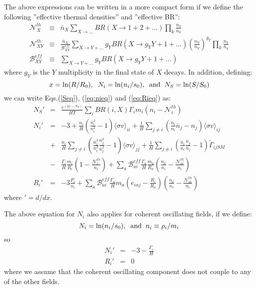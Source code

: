 \documentclass[preprint,notoc]{JHEP3}
\def\to{\rightarrow}
\def\to{\rightarrow}
\begin{document}
 
The above expressions can be written in a more compact form if we define
the following ''effective thermal densities'' and ''effective BR'':
\begin{eqnarray}
\mathcal{N}^{th}_{X} & \equiv &  \bar{n}_X \sum_{X \to \ldots} BR(X \to 1 + 2 +
\ldots)
\prod_{k}
\frac{n_k}{\bar{n}_k} \nonumber \\
\mathcal{N}^{th}_{XY} & \equiv & \frac{\bar{n}_X}{\mathcal{B}^{eff}_{XY}}
\sum_{X \to Y + \ldots} g_Y BR(X \to g_Y Y + 1 + \ldots)
\left(\frac{n_Y}{\bar{n}_Y}\right)^{g_Y} \prod_{k} \frac{n_k}{\bar{n}_k}
\nonumber \\
\mathcal{B}^{eff}_{XY} & \equiv & \sum_{X \to Y + \ldots} g_Y BR(X \to g_Y Y +
1+\ldots) \nonumber
\end{eqnarray}
where $g_Y$ is the $Y$ multiplicity in the final state of $X$ decays. 
In addition, defining:
\begin{equation}
x = \ln(R/R_0),\;\; N_i = \ln(n_i/s_0),\;\; {\rm and}\;\; N_S = \ln(S/S_0)
\end{equation}
we can write Eqs.(\ref{Seq}), (\ref{eq:nieq}) and (\ref{eq:Rieq}) as:
\begin{eqnarray}
N_S' & = & \frac{e^{(3 x - N_S)}}{HT} \sum_{i} BR(i,X) \Gamma_i m_i \left(n_i -
\mathcal{N}_{i}^{th} \right) 
\label{Seqb} \\
N_i' & = & -3 
+ \frac{n_i}{H}\left( \frac{\bar{n}_i^2}{n_i^2} -1 \right) \langle \sigma v \rangle_{ii} 
+ \frac{1}{H} \sum_{j\neq i} \left( \frac{\bar{n}_i}{n_i} \bar{n}_j - n_j \right) \langle \sigma v \rangle_{ij} \nonumber \\
&+& \frac{n_i}{H} \sum_{j\neq i} \left(\frac{\bar{n}_i^2}{n_i^2}\frac{n_j^2}{\bar{n}_j^2}  - 1 \right) \langle \sigma v \rangle_{jj}
+ \frac{1}{H} \sum_{j\neq i} \left(\frac{\bar{n}_i}{n_i}\frac{n_j}{\bar{n}_j}  - 1\right)  \tilde{\Gamma}_{ijSM}  \nonumber \\
&-&  \frac{\Gamma_i}{H} \frac{m_i}{R_i}\left(1 -
\frac{\mathcal{N}_{i}^{th}}{n_i} \right)
 +  \sum_{a} \mathcal{B}_{ai}^{eff} \frac{\Gamma_a}{H}
 \frac{m_a}{R_a}\left(\frac{n_a}{n_i} - \frac{\mathcal{N}_{ai}^{th}}{n_i}
  \right)
 \\
R_i' & = &  -3 \frac{P_i}{n_i} + \sum_{a} \mathcal{B}_{ai}^{eff}
\frac{\Gamma_a}{H} m_a \left( e_{inj} - \frac{R_i}{R_a} \right) \left(\frac{n_a}{n_i} -
\frac{\mathcal{N}_{ai}^{th}}{n_i} \right)
\label{Nieq}
\end{eqnarray}
where $'=d/dx$.

The above equation for $N_i$ also applies for coherent oscillating fields, if we define:
\begin{equation}
N_i = \ln(n_i/s_0),\;\; {\rm and}\;\; n_i \equiv \rho_i/m_i
\end{equation}
so
\begin{eqnarray}
N_i' & = & -3 - \frac{\Gamma_i}{H}  \nonumber \\
R_i'& = & 0 \label{Nico}
\end{eqnarray}
where we assume that the coherent oscillating component does not couple to any of the other fields.
\end{document}
